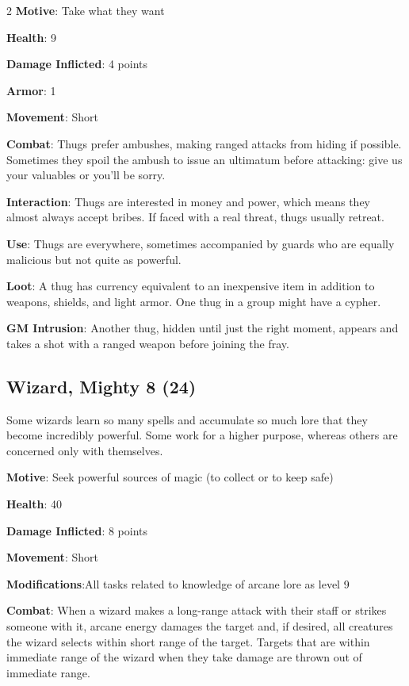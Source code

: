 \begin{multicols}{2}
\textbf{Motive}: Take what they want

\textbf{Health}: 9

\textbf{Damage Inflicted}: 4 points

\textbf{Armor}: 1

\textbf{Movement}: Short

\textbf{Combat}: Thugs prefer ambushes, making ranged attacks from hiding if possible. Sometimes they spoil the ambush to issue an ultimatum before attacking: give us your valuables or you’ll be sorry.

\textbf{Interaction}: Thugs are interested in money and power, which means they almost always accept bribes. If faced with a real threat, thugs usually retreat.

\textbf{Use}: Thugs are everywhere, sometimes accompanied by guards who are equally malicious but not quite as powerful.

\textbf{Loot}: A thug has currency equivalent to an inexpensive item in addition to weapons, shields, and light armor. One thug in a group might have a cypher.

\textbf{GM Intrusion}: Another thug, hidden until just the right moment, appears and takes a shot with a ranged weapon before joining the fray.

\subsection{Wizard, Mighty	8 (24)}

Some wizards learn so many spells and accumulate so much lore that they become incredibly powerful. Some work for a higher purpose, whereas others are concerned only with themselves.

\textbf{Motive}: Seek powerful sources of magic (to collect or to keep safe)

\textbf{Health}: 40

\textbf{Damage Inflicted}: 8 points

\textbf{Movement}: Short

\textbf{Modifications}:All tasks related to knowledge of arcane lore as level 9

\textbf{Combat}: When a wizard makes a long-range attack with their staff or strikes someone with it, arcane energy damages the target and, if desired, all creatures the wizard selects within short range of the target. Targets that are within immediate range of the wizard when they take damage are thrown out of immediate range.


\end{multicols}
